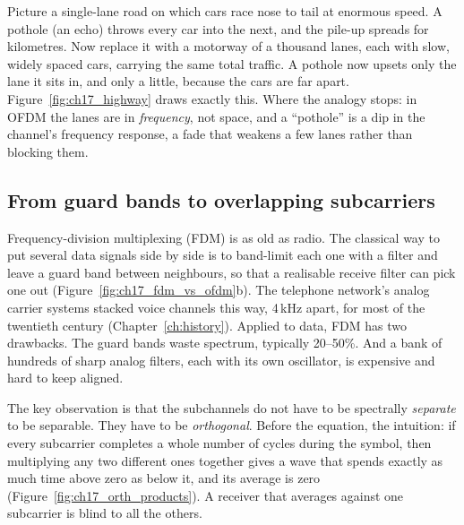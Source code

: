 \begin{analogy}
Picture a single-lane road on which cars race nose to tail at enormous speed. A pothole (an echo)
throws every car into the next, and the pile-up spreads for kilometres. Now replace it with a
motorway of a thousand lanes, each with slow, widely spaced cars, carrying the same total
traffic. A pothole now upsets only the lane it sits in, and only a little, because the cars are
far apart. Figure~\ref{fig:ch17_highway} draws exactly this. Where the analogy stops: in OFDM the
lanes are in \emph{frequency}, not space, and a ``pothole'' is a dip in the channel's frequency
response, a fade that weakens a few lanes rather than blocking them.
\end{analogy}


\subsection{From guard bands to overlapping subcarriers}

Frequency-division multiplexing (FDM) is as old as radio. The classical way to put several data
signals side by side is to band-limit each one with a filter and leave a guard band between
neighbours, so that a realisable receive filter can pick one out
(Figure~\ref{fig:ch17_fdm_vs_ofdm}b). The telephone network's analog carrier systems stacked voice
channels this way, 4\,kHz apart, for most of the twentieth century (Chapter~\ref{ch:history}).
Applied to data, FDM has two drawbacks. The guard bands waste spectrum, typically 20--50\%. And a
bank of hundreds of sharp analog filters, each with its own oscillator, is expensive and hard to
keep aligned.

The key observation is that the subchannels do not have to be spectrally \emph{separate} to be
separable. They have to be \emph{orthogonal}. Before the equation, the intuition: if every
subcarrier completes a whole number of cycles during the symbol, then multiplying any two
different ones together gives a wave that spends exactly as much time above zero as below it, and
its average is zero (Figure~\ref{fig:ch17_orth_products}). A receiver that averages against one
subcarrier is blind to all the others.

